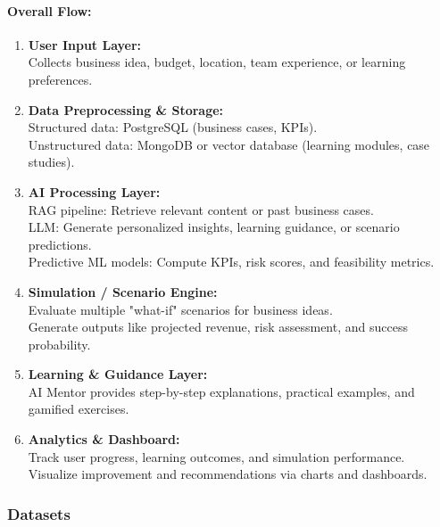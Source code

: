 \documentclass[12pt,letterpaper]{article}
\begin{document}
\paragraph{Overall Flow:}
\begin{enumerate}
    \item \textbf{User Input Layer:} \\
          Collects business idea, budget, location, team experience, or learning preferences.
    
    \item \textbf{Data Preprocessing \& Storage:} \\
          Structured data: PostgreSQL (business cases, KPIs). \\
          Unstructured data: MongoDB or vector database (learning modules, case studies).
    
    \item \textbf{AI Processing Layer:} \\
          RAG pipeline: Retrieve relevant content or past business cases. \\
          LLM: Generate personalized insights, learning guidance, or scenario predictions. \\
          Predictive ML models: Compute KPIs, risk scores, and feasibility metrics.
    
    \item \textbf{Simulation / Scenario Engine:} \\
          Evaluate multiple "what-if" scenarios for business ideas. \\
          Generate outputs like projected revenue, risk assessment, and success probability.
    
    \item \textbf{Learning \& Guidance Layer:} \\
          AI Mentor provides step-by-step explanations, practical examples, and gamified exercises.
    
    \item \textbf{Analytics \& Dashboard:} \\
          Track user progress, learning outcomes, and simulation performance. \\
          Visualize improvement and recommendations via charts and dashboards.
\end{enumerate}

\subsubsection{ Datasets}
\end{document}
